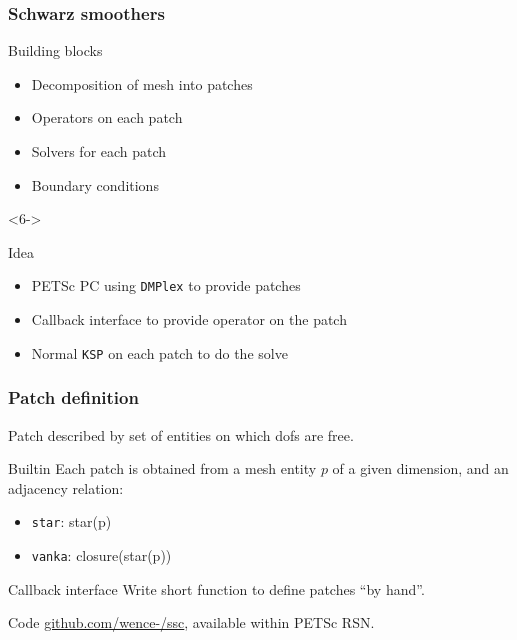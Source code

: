 \documentclass[presentation,aspectratio=43]{beamer}
\begin{document}
\begin{frame}
  \frametitle{Schwarz smoothers}
  \begin{block}{Building blocks}
    \begin{itemize}
    \item Decomposition of mesh into patches
    \item Operators on each patch
    \item Solvers for each patch
    \item Boundary conditions
    \end{itemize}
  \end{block}
  \begin{uncoverenv}<6->
    \begin{block}{Idea}
      \begin{itemize}
      \item PETSc PC using \texttt{DMPlex} to provide patches
      \item Callback interface to provide operator on the patch
      \item Normal \texttt{KSP} on each patch to do the solve
      \end{itemize}
    \end{block}
  \end{uncoverenv}
\end{frame}

\begin{frame}[fragile]
  \frametitle{Patch definition}
  Patch described by set of entities on which dofs are free.
  \begin{block}{Builtin}
    Each patch is obtained from a mesh entity $p$ of a given dimension,
    and an adjacency relation:
    \begin{itemize}
    \item \texttt{star}: star(p)
    \item \texttt{vanka}: closure(star(p))
    \end{itemize}
  \end{block}
  \begin{block}{Callback interface}
    Write short function to define patches ``by hand''.
  \end{block}
  \begin{block}{Code}
    \url{github.com/wence-/ssc}, available within PETSc RSN.
  \end{block}
\end{frame}
\end{document}
